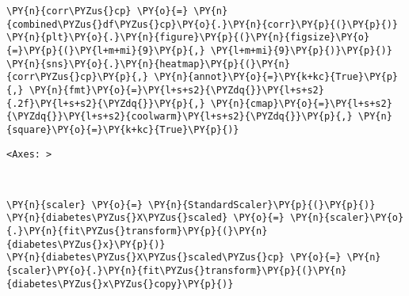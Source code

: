     \begin{tcolorbox}[breakable, size=fbox, boxrule=1pt, pad at break*=1mm,colback=cellbackground, colframe=cellborder]
\begin{Verbatim}[commandchars=\\\{\}]
\PY{n}{corr\PYZus{}cp} \PY{o}{=} \PY{n}{combined\PYZus{}df\PYZus{}cp}\PY{o}{.}\PY{n}{corr}\PY{p}{(}\PY{p}{)}
\PY{n}{plt}\PY{o}{.}\PY{n}{figure}\PY{p}{(}\PY{n}{figsize}\PY{o}{=}\PY{p}{(}\PY{l+m+mi}{9}\PY{p}{,} \PY{l+m+mi}{9}\PY{p}{)}\PY{p}{)}
\PY{n}{sns}\PY{o}{.}\PY{n}{heatmap}\PY{p}{(}\PY{n}{corr\PYZus{}cp}\PY{p}{,} \PY{n}{annot}\PY{o}{=}\PY{k+kc}{True}\PY{p}{,} \PY{n}{fmt}\PY{o}{=}\PY{l+s+s2}{\PYZdq{}}\PY{l+s+s2}{.2f}\PY{l+s+s2}{\PYZdq{}}\PY{p}{,} \PY{n}{cmap}\PY{o}{=}\PY{l+s+s2}{\PYZdq{}}\PY{l+s+s2}{coolwarm}\PY{l+s+s2}{\PYZdq{}}\PY{p}{,} \PY{n}{square}\PY{o}{=}\PY{k+kc}{True}\PY{p}{)}
\end{Verbatim}
\end{tcolorbox}

            \begin{tcolorbox}[breakable, size=fbox, boxrule=.5pt, pad at break*=1mm, opacityfill=0]
\begin{Verbatim}[commandchars=\\\{\}]
<Axes: >
\end{Verbatim}
\end{tcolorbox}
        
    \begin{center}
    \end{center}
    { \hspace*{\fill} \\}
    
    \begin{tcolorbox}[breakable, size=fbox, boxrule=1pt, pad at break*=1mm,colback=cellbackground, colframe=cellborder]
\begin{Verbatim}[commandchars=\\\{\}]
\PY{n}{scaler} \PY{o}{=} \PY{n}{StandardScaler}\PY{p}{(}\PY{p}{)}
\PY{n}{diabetes\PYZus{}X\PYZus{}scaled} \PY{o}{=} \PY{n}{scaler}\PY{o}{.}\PY{n}{fit\PYZus{}transform}\PY{p}{(}\PY{n}{diabetes\PYZus{}x}\PY{p}{)}
\PY{n}{diabetes\PYZus{}X\PYZus{}scaled\PYZus{}cp} \PY{o}{=} \PY{n}{scaler}\PY{o}{.}\PY{n}{fit\PYZus{}transform}\PY{p}{(}\PY{n}{diabetes\PYZus{}x\PYZus{}copy}\PY{p}{)}
\end{Verbatim}
\end{tcolorbox}

